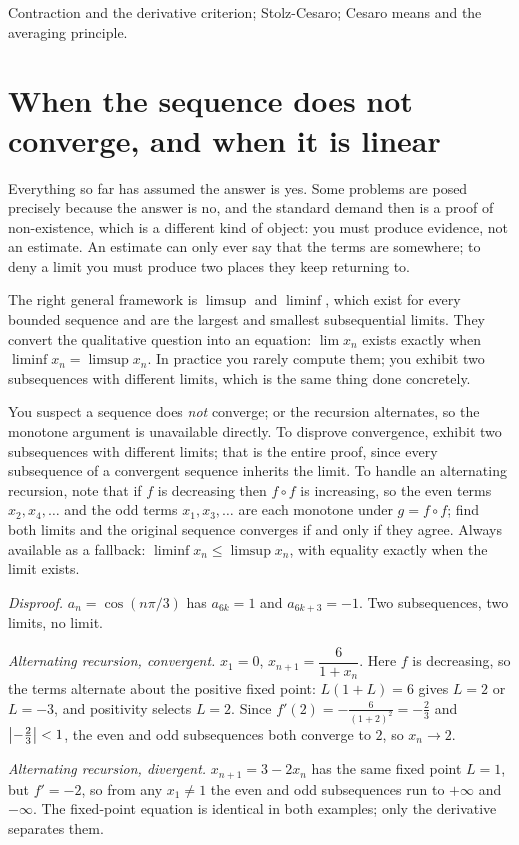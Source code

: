 \begin{seealsob}Contraction and the derivative criterion; Stolz-Cesaro; Cesaro means and the averaging principle.\end{seealsob}

\section{When the sequence does not converge, and when it is linear}

Everything so far has assumed the answer is yes. Some problems are posed precisely because the answer is no, and the standard demand then is a proof of non-existence, which is a different kind of object: you must produce evidence, not an estimate. An estimate can only ever say that the terms are somewhere; to deny a limit you must produce two places they keep returning to.

The right general framework is $\limsup$ and $\liminf$, which exist for every bounded sequence and are the largest and smallest subsequential limits. They convert the qualitative question into an equation: $\lim x_n$ exists exactly when $\liminf x_n=\limsup x_n$. In practice you rarely compute them; you exhibit two subsequences with different limits, which is the same thing done concretely.

\cue You suspect a sequence does \emph{not} converge; or the recursion alternates, so the monotone argument is unavailable directly.
\method To disprove convergence, exhibit two subsequences with different limits; that is the entire proof, since every subsequence of a convergent sequence inherits the limit. To handle an alternating recursion, note that if $f$ is decreasing then $f\circ f$ is increasing, so the even terms $x_2,x_4,\ldots$ and the odd terms $x_1,x_3,\ldots$ are each monotone under $g=f\circ f$; find both limits and the original sequence converges if and only if they agree. Always available as a fallback: $\liminf x_n\leq\limsup x_n$, with equality exactly when the limit exists.

\begin{worked}
\emph{Disproof.} $a_n=\cos(n\pi/3)$ has $a_{6k}=1$ and $a_{6k+3}=-1$. Two subsequences, two limits, no limit.

\emph{Alternating recursion, convergent.} $x_1=0$, $x_{n+1}=\dfrac{6}{1+x_n}$. Here $f$ is decreasing, so the terms alternate about the positive fixed point: $L(1+L)=6$ gives $L=2$ or $L=-3$, and positivity selects $L=2$. Since $f'(2)=-\tfrac{6}{(1+2)^2}=-\tfrac23$ and $\left\lvert -\tfrac23\right\rvert<1$, the even and odd subsequences both converge to $2$, so $x_n\to2$.

\emph{Alternating recursion, divergent.} $x_{n+1}=3-2x_n$ has the same fixed point $L=1$, but $f'=-2$, so from any $x_1\neq1$ the even and odd subsequences run to $+\infty$ and $-\infty$. The fixed-point equation is identical in both examples; only the derivative separates them.
\end{worked}

